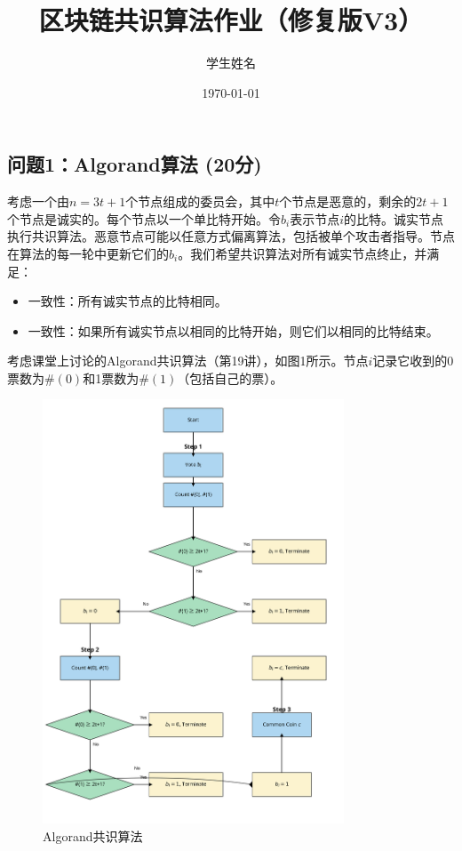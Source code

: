 \documentclass[12pt,a4paper]{article}
\title{区块链共识算法作业（修复版V3）}
\author{学生姓名}
\date{\today}
\begin{document}
\begin{CJK}{UTF8}{gbsn}

\maketitle

\section{问题1：Algorand算法 (20分)}

考虑一个由$n = 3t + 1$个节点组成的委员会，其中$t$个节点是恶意的，剩余的$2t + 1$个节点是诚实的。每个节点以一个单比特开始。令$b_i$表示节点$i$的比特。诚实节点执行共识算法。恶意节点可能以任意方式偏离算法，包括被单个攻击者指导。节点在算法的每一轮中更新它们的$b_i$。我们希望共识算法对所有诚实节点终止，并满足：

\begin{itemize}
    \item 一致性：所有诚实节点的比特相同。
    \item 一致性：如果所有诚实节点以相同的比特开始，则它们以相同的比特结束。
\end{itemize}

考虑课堂上讨论的Algorand共识算法（第19讲），如图1所示。节点$i$记录它收到的0票数为$\#(0)$和1票数为$\#(1)$（包括自己的票）。

\begin{figure}[H] %
    \centering
    \includegraphics[width=0.8\textwidth]{images/algorand_algorithm_improved.png}
    \caption{Algorand共识算法}
\end{figure}


\end{CJK}
\end{document}
